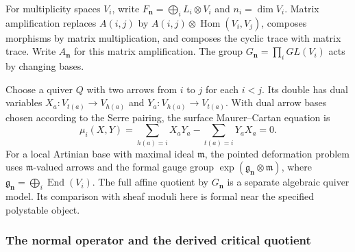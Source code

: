 For multiplicity spaces $V_i$, write
$F_{\mathbf n}=\bigoplus_iL_i\otimes V_i$ and $n_i=\dim V_i$.
Matrix amplification replaces $A(i,j)$ by
$A(i,j)\otimes\operatorname{Hom}(V_i,V_j)$, composes morphisms
by matrix multiplication, and composes the cyclic trace with matrix
trace. Write $A_{\mathbf n}$ for this matrix amplification.
The group $G_{\mathbf n}=\prod_iGL(V_i)$ acts by changing bases.

Choose a quiver $Q$ with two arrows from $i$ to $j$ for each $i<j$.
Its double has dual variables
$X_a:V_{t(a)}\to V_{h(a)}$ and
$Y_a:V_{h(a)}\to V_{t(a)}$. With dual arrow bases chosen according
to the Serre pairing, the surface Maurer--Cartan equation is
\begin{equation}
\label{hall:eq:preprojective-moment}
 \mu_i(X,Y)=\sum_{h(a)=i}X_aY_a-\sum_{t(a)=i}Y_aX_a=0.
\end{equation}
For a local Artinian base with maximal ideal $\mathfrak m$, the
pointed deformation problem uses $\mathfrak m$-valued arrows and
the formal gauge group
$\exp(\mathfrak g_{\mathbf n}\otimes\mathfrak m)$, where
$\mathfrak g_{\mathbf n}=\bigoplus_i\operatorname{End}(V_i)$.
The full affine quotient by $G_{\mathbf n}$ is a separate algebraic
quiver model. Its comparison with sheaf moduli here is formal near
the specified polystable object.

\subsubsection*{The normal operator and the derived critical quotient}

